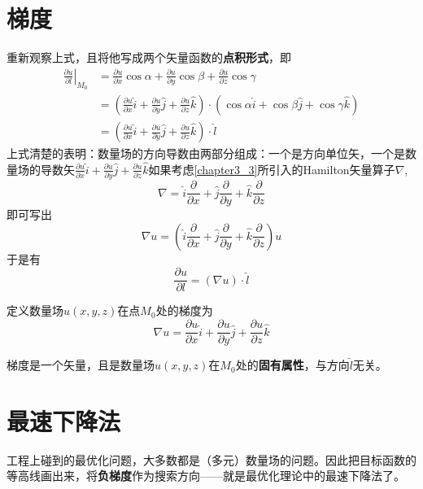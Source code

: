 \section{梯度}\label{chapter4_3}
重新观察上式，且将他写成两个矢量函数的\textbf{点积形式}，即
\begin{equation*}
\begin{aligned}
\left. \frac{\partial u}{\partial l} \right|_{M_0}&=\frac{\partial u}{\partial x}\cos \alpha +\frac{\partial u}{\partial y}\cos \beta +\frac{\partial u}{\partial z}\cos \gamma 
\\
&=\left( \frac{\partial u}{\partial x}\hat{i}+\frac{\partial u}{\partial y}\hat{j}+\frac{\partial u}{\partial z}\hat{k} \right) \cdot \left( \cos \alpha \hat{i}+\cos \beta \hat{j}+\cos \gamma \hat{k} \right) 
\\
&=\left( \frac{\partial u}{\partial x}\hat{i}+\frac{\partial u}{\partial y}\hat{j}+\frac{\partial u}{\partial z}\hat{k} \right) \cdot \hat{l}
\end{aligned}
\end{equation*}
上式清楚的表明：数量场的方向导数由两部分组成：一个是方向单位矢，一个是数量场的导数矢$ \frac{\partial u}{\partial x}\hat{i}+\frac{\partial u}{\partial y}\hat{j}+\frac{\partial u}{\partial z}\hat{k}   $如果考虑\ref{chapter3_3}所引入的Hamilton矢量算子$ \nabla $,
\[
\nabla=\hat{i}\frac{\partial}{\partial x}
+\hat{j}\frac{\partial}{\partial y}
+\hat{k}\frac{\partial}{\partial z}
\]
即可写出
\[
\nabla u=  \left(  \hat{i}\frac{\partial}{\partial x}
+\hat{j}\frac{\partial}{\partial y}
+\hat{k}\frac{\partial}{\partial z}
 \right) u 
 \]
 于是有
\[
\frac{\partial u}{\partial l}=\left( \nabla u \right) \cdot \hat{l}
\]

定义数量场$ u\left(x,y,z\right) $在点$ M_0 $处的梯度为
\[
\nabla u=\frac{\partial u}{\partial x}\hat{i}+\frac{\partial u}{\partial y}\hat{j}+\frac{\partial u}{\partial z}\hat{k}
\]

\begin{newdef}[]
	梯度是一个矢量，且是数量场$ u\left(x,y,z\right) $在$ M_0 $处的\textbf{固有属性}，与方向$ \hat{l} $无关。

\end{newdef}

\section{最速下降法}\label{chapter4_4}

工程上碰到的最优化问题，大多数都是（多元）数量场的问题。因此把目标函数的等高线画出来，将\textbf{负梯度}作为搜索方向——就是最优化理论中的最速下降法了。




